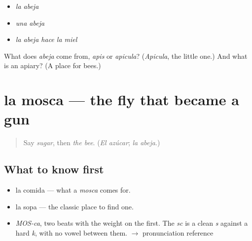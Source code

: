 \begin{itemize}
\raggedright
  \item \emph{la abeja}
  \item \emph{una abeja}
  \item \emph{la abeja hace la miel}
\end{itemize}

\begin{tcolorbox}[breakable,colback=teal!4,colframe=teal!35!black,title={Before you move on}]
What does \emph{abeja} come from, \emph{apis} or \emph{apicula}? (\emph{Apicula}, the little one.) And what is an apiary? (A place for bees.)
\end{tcolorbox}
\section[la mosca]{la mosca — the fly that became a gun}

\label{lesson:ES-C368-mosca}



\begin{quote}
Say \emph{sugar}, then \emph{the bee}. (\emph{El azúcar}; \emph{la abeja}.)
\end{quote}

\subsection*{What to know first}
\begin{itemize}
\raggedright
  \item la comida — what a \emph{mosca} comes for.
  \item la sopa — the classic place to find one.
\end{itemize}

\begin{sounds}
\begin{itemize}
\raggedright
  \item \emph{MOS-ca}, two beats with the weight on the first. The \emph{sc} is a clean \emph{s} against a hard \emph{k}, with no vowel between them. $\to$ pronunciation reference
\end{itemize}
\end{sounds}

